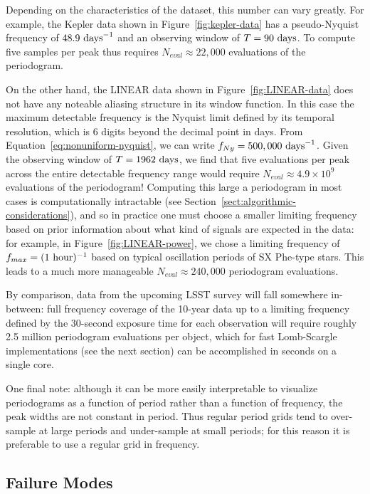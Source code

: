 \documentclass[preprint]{aastex}
\newcommand{\fig}[1]{Figure~\ref{fig:#1}}
\newcommand{\Eq}[1]{Equation~\ref{eq:#1}}
\newcommand{\eq}[1]{\Eq{#1}}
\newcommand{\Sect}[1]{Section~\ref{sect:#1}}
\newcommand{\sect}[1]{\Sect{#1}}
\newcommand{\sectlabel}[1]{\label{sect:#1}}
\begin{document}
Depending on the characteristics of the dataset, this number can vary greatly.
For example, the Kepler data shown in \fig{kepler-data} has a pseudo-Nyquist
frequency of $48.9\ {\rm days}^{-1}$ and
an observing window of $T = 90\ {\rm days}$.
To compute five samples per peak thus requires $N_{eval} \approx 22,000$
evaluations of the periodogram.

On the other hand, the LINEAR data shown in \fig{LINEAR-data} does not have
any noteable aliasing structure in its window function.
In this case the maximum detectable frequency is the Nyquist limit defined
by its temporal resolution, which is 6 digits beyond the decimal point in days.
From \eq{nonuniform-nyquist}, we can write $f_{Ny} = 500,000\ {\rm days}^{-1}$.
Given the observing window of $T = 1962\ {\rm days}$, we find that five
evaluations per peak across the entire detectable frequency range
would require $N_{eval} \approx 4.9 \times 10^9$ evaluations of the periodogram!
Computing this large a periodogram in most cases is computationally intractable
(see \sect{algorithmic-considerations}), and so in practice one must choose
a smaller limiting frequency based on prior information about what kind of
signals are expected in the data: for example, in \fig{LINEAR-power}, we chose
a limiting frequency of $f_{max} = (1\ {\rm hour})^{-1}$ based on typical
oscillation periods of SX Phe-type stars. This leads to a much more manageable
$N_{eval} \approx 240,000$ periodogram evaluations.

By comparison, data from the upcoming LSST survey \citep{Ivezic08LSST}
will fall somewhere in-between: full frequency coverage of
the 10-year data up to a limiting frequency defined by the 30-second
exposure time for each observation will require roughly 2.5 million
periodogram evaluations per object, which for fast Lomb-Scargle implementations
(see the next section) can be accomplished in seconds on a single core.

One final note: although it can be more easily interpretable to
visualize periodograms as a function of period rather than a function of
frequency, the peak widths are not constant in period.
Thus regular period grids tend to over-sample at large periods and under-sample
at small periods;
for this reason it is preferable to use a regular grid in frequency.


\subsection{Failure Modes}
\sectlabel{failure-modes}
\end{document}
